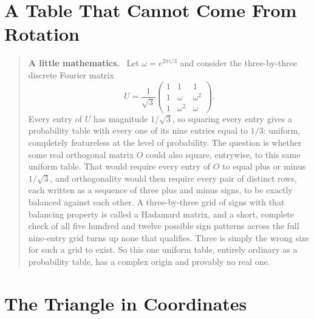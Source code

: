 \documentclass[12pt,openany]{book}
\newenvironment{lowmath}{\begin{quote}\small\noindent\textbf{A little mathematics.}\ }{\end{quote}}
\begin{document}
\section{A Table That Cannot Come From Rotation}

\begin{lowmath}
Let $\omega=e^{2\pi i/3}$ and consider the three-by-three discrete Fourier matrix
\[
U=\frac{1}{\sqrt3}\begin{pmatrix}1&1&1\\1&\omega&\omega^2\\1&\omega^2&\omega\end{pmatrix}.
\]
Every entry of $U$ has magnitude $1/\sqrt3$, so squaring every entry gives a probability table with every one of its nine entries equal to $1/3$: uniform, completely featureless at the level of probability. The question is whether some real orthogonal matrix $O$ could also square, entrywise, to this same uniform table. That would require every entry of $O$ to equal plus or minus $1/\sqrt3$, and orthogonality would then require every pair of distinct rows, each written as a sequence of three plus and minus signs, to be exactly balanced against each other. A three-by-three grid of signs with that balancing property is called a Hadamard matrix, and a short, complete check of all five hundred and twelve possible sign patterns across the full nine-entry grid turns up none that qualifies. Three is simply the wrong size for such a grid to exist. So this one uniform table, entirely ordinary as a probability table, has a complex origin and provably no real one.
\end{lowmath}

\section{The Triangle in Coordinates}
\end{document}
